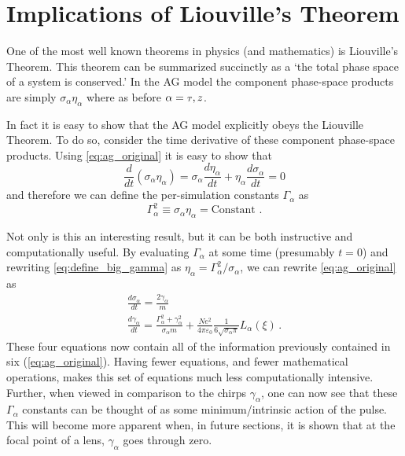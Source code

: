 
\section{Implications of Liouville's Theorem} \label{sec:liouville}

One of the most well known theorems in physics (and mathematics) is Liouville's Theorem.
This theorem can be summarized succinctly as a `the total phase space of a system is conserved.'
In the AG model the component phase-space products are simply $\sigma_{\alpha} \eta_{\alpha}$ where as before $ \alpha = {\scriptscriptstyle T}, z$.

In fact it is easy to show that the AG model explicitly obeys the Liouville Theorem.
To do so, consider the time derivative of these component phase-space products.
Using \ref{eq:ag_original} it is easy to show that
\begin{equation}
  \frac{d}{dt} (\sigma_{\alpha} \eta_{\alpha}) = \sigma_{\alpha} \frac{d \eta_{\alpha}}{dt} + \eta_{\alpha} \frac{d \sigma_{\alpha}}{dt} = 0
\end{equation}
and therefore we can define the per-simulation constants $\Gamma_{\alpha}$ as
\begin{equation} \label{eq:define_big_gamma}
  \Gamma_{\alpha}^2 \equiv \sigma_{\alpha} \eta_{\alpha} = \text{Constant .}
\end{equation}

Not only is this an interesting result, but it can be both instructive and computationally useful.
By evaluating $\Gamma_{\alpha}$ at some time (presumably $t=0$) and rewriting \ref{eq:define_big_gamma} as $\eta_{\alpha} = \Gamma_{\alpha}^2 / \sigma_{\alpha}$, we can rewrite \ref{eq:ag_original} as 
\begin{subequations} \label{eq:ag_big_gamma}
\begin{gather}
  \frac{d\sigma_{\alpha}}{dt} = \frac{2\gamma_{\alpha}}{m} \\
  \frac{d\gamma_{\alpha}}{dt} = \frac{ \Gamma_{\alpha}^2 + \gamma_{\alpha}^2 }{\sigma_{\alpha} m}
    + \frac{N e^2}{4\pi\varepsilon_0} \frac{1}{6 \sqrt{\sigma_{\alpha}\pi}} L_{\alpha}(\xi) \, \text{.} \label{eq:ag_big_gamma_gamma}
\end{gather}
\end{subequations}
These four equations now contain all of the information previously contained in six (\ref{eq:ag_original}).
Having fewer equations, and fewer mathematical operations, makes this set of equations much less computationally intensive.
Further, when viewed in comparison to the chirps $\gamma_{\alpha}$, one can now see that these $\Gamma_{\alpha}$ constants can be thought of as some minimum/intrinsic action of the pulse.
This will become more apparent when, in future sections,
it is shown that at the focal point of a lens, $\gamma_{\alpha}$ goes through zero.

